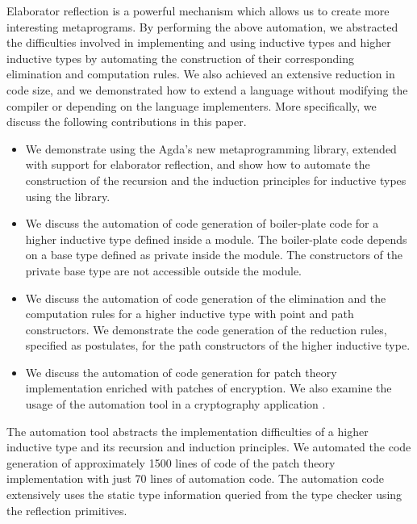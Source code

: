 \documentclass[sigplan,10pt]{acmart}
\begin{document}
Elaborator reflection is a powerful mechanism which allows us to create more interesting metaprograms. By performing the above automation, we abstracted the difficulties involved in implementing and using inductive types and higher inductive types by automating the construction of their corresponding elimination and computation rules. We also achieved an extensive reduction in code size, and we demonstrated how to extend a language without modifying the compiler or depending on the language implementers. More specifically, we discuss the following contributions in this paper.

\begin{itemize}
\item We demonstrate using the Agda's new metaprogramming library, extended with support for elaborator reflection, and show how to automate the construction of the recursion and the induction principles for inductive types using the library.

\item We discuss the automation of code generation of boiler-plate code for a higher inductive type defined inside a module. The boiler-plate code depends on a base type defined as private inside the module. The constructors of the private base type are not accessible outside the module.

\item We discuss the automation of code generation of the elimination and the computation rules for a higher inductive type with point and path constructors. We demonstrate the code generation of the reduction rules, specified as postulates, for the path constructors of the higher inductive type.

\item We discuss the automation of code generation for patch theory \cite{Angiuli-2014} implementation enriched with patches of encryption. We also examine the usage of the automation tool in a cryptography application \cite{Paventhan-2018}.
\end{itemize}

The automation tool abstracts the implementation difficulties of a higher inductive type and its recursion and induction principles. We automated the code generation of approximately 1500 lines of code of the patch theory implementation with just 70 lines of automation code. The automation code extensively uses the static type information queried from the type checker using the reflection primitives.
\end{document}
